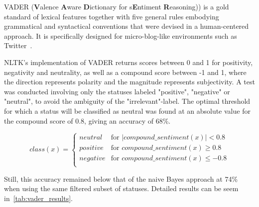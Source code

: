 VADER (\textbf{V}alence \textbf{A}ware \textbf{D}ictionary for s\textbf{E}ntiment \textbf{R}easoning))
is a gold standard of lexical features together with five general rules embodying grammatical and syntactical conventions
that were devised in a human-centered approach.
It is specifically designed for micro-blog-like environments such as Twitter~\cite{Hutto2014}.

NLTK's implementation of VADER returns scores between 0 and 1 for positivity, negativity and neutrality,
as well as a compound score between -1 and 1, where the direction represents polarity and the magnitude represents subjectivity.
A test was conducted involving only the statuses labeled "positive", "negative" or "neutral",
to avoid the ambiguity of the "irrelevant"-label.
The optimal threshold for which a status will be classified as neutral was found
at an absolute value for the compound score of 0.8, giving an accuracy of 68\%.

\begin{equation}
    class(x) =
    \begin{cases}
        neutral & \text{for } |compound\_sentiment(x)| < 0.8 \\
        positive & \text{for } compound\_sentiment(x) \geq 0.8 \\
        negative & \text{for } compound\_sentiment(x) \leq -0.8 \\
    \end{cases}
\end{equation}

Still, this accuracy remained below that of the naive Bayes approach at 74\% when using the same filtered subset of statuses.
Detailed results can be seem in~\cref{tab:vader_results}.


